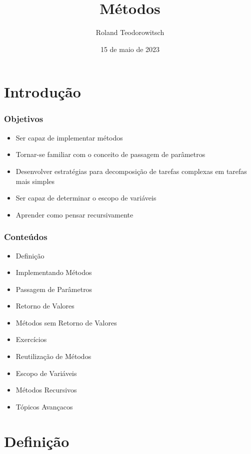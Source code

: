 \documentclass[xcolor={dvipsnames,table},aspectratio=169]{beamer}
\title[\sc{Métodos}]{Métodos}
\author[Roland Teodorowitsch]{Roland Teodorowitsch}
\institute[FPROG - EP - PUCRS]{Fundamentos de Programação - Escola Politécnica - PUCRS}
\date{15 de maio de 2023}
\begin{document}
\justifying

\begin{frame}
	\titlepage
\end{frame}

\section{Introdução}

\begin{frame}\frametitle{Objetivos}
\begin{itemize}
	\item Ser capaz de implementar métodos
	\item Tornar-se familiar com o conceito de passagem de parâmetros
	\item Desenvolver estratégias para decomposição de tarefas complexas em tarefas mais simples
	\item Ser capaz de determinar o escopo de variáveis
	\item Aprender como pensar recursivamente
\end{itemize}
\end{frame}

\begin{frame}\frametitle{Conteúdos}
\begin{itemize}
	\item Definição
	\item Implementando Métodos
	\item Passagem de Parâmetros
	\item Retorno de Valores
	\item Métodos sem Retorno de Valores
	\item Exercícios	
	\item Reutilização de Métodos
	\item Escopo de Variáveis
	\item Métodos Recursivos
	\item Tópicos Avançacos
\end{itemize}
\end{frame}

\section{Definição}
\end{document}
